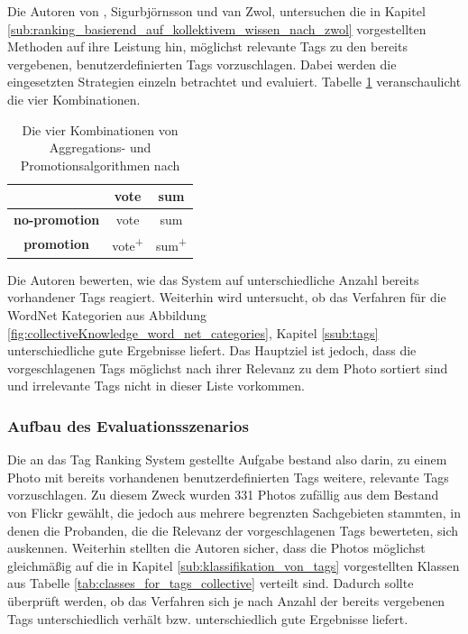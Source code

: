 Die Autoren von \cite{collectiveKnowledge}, Sigurbjörnsson und van Zwol, untersuchen die in Kapitel \ref{sub:ranking_basierend_auf_kollektivem_wissen_nach_zwol} vorgestellten Methoden auf ihre Leistung hin, möglichst relevante Tags zu den bereits vergebenen, benutzerdefinierten Tags vorzuschlagen. Dabei werden die eingesetzten Strategien einzeln betrachtet und evaluiert. Tabelle \ref{tab:fourStrategiesBjoern} veranschaulicht die vier Kombinationen.

\begin{table}[htbp]
  \centering
  \begin{tabular}{c|cc}
    \hline
     & \textbf{vote} & \textbf{sum}\\
    \hline
    \textbf{no-promotion} & vote & sum\\
    \hline
    \textbf{promotion} & vote\textsuperscript{+} & sum\textsuperscript{+}\\
    \hline
  \end{tabular}
  \caption{Die vier Kombinationen von Aggregations- und Promotionsalgorithmen nach \cite{collectiveKnowledge}}
  \label{tab:fourStrategiesBjoern}
\end{table}


Die Autoren bewerten, wie das System auf unterschiedliche Anzahl bereits vorhandener Tags reagiert. Weiterhin wird untersucht, ob das Verfahren für die WordNet Kategorien aus Abbildung \ref{fig:collectiveKnowledge_word_net_categories}, Kapitel \ref{ssub:tags} unterschiedliche gute Ergebnisse liefert. Das Hauptziel ist jedoch, dass die vorgeschlagenen Tags möglichst nach ihrer Relevanz zu dem Photo sortiert sind und irrelevante Tags nicht in dieser Liste vorkommen.

\subsubsection{Aufbau des Evaluationsszenarios} %
\label{ssub:aufbau_des_evaluationsszenarios}

Die an das Tag Ranking System gestellte Aufgabe bestand also darin, zu einem Photo mit bereits vorhandenen benutzerdefinierten Tags weitere, relevante Tags vorzuschlagen. Zu diesem Zweck wurden 331 Photos zufällig aus dem Bestand von Flickr gewählt, die jedoch aus mehrere begrenzten Sachgebieten stammten, in denen die Probanden, die die Relevanz der vorgeschlagenen Tags bewerteten, sich auskennen.
Weiterhin stellten die Autoren sicher, dass die Photos möglichst gleichmäßig auf die in Kapitel \ref{sub:klassifikation_von_tags} vorgestellten Klassen aus Tabelle \ref{tab:classes_for_tags_collective} verteilt sind. Dadurch sollte überprüft werden, ob das Verfahren sich je nach Anzahl der bereits vergebenen Tags unterschiedlich verhält bzw. unterschiedlich gute Ergebnisse liefert.
  
